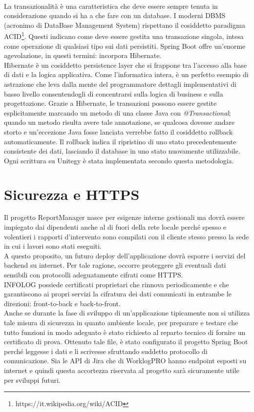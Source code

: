 \\
La transazionalità è una caratteristica che deve essere sempre tenuta in considerazione quando si ha a che fare con un database.
I moderni DBMS (acronimo di DataBase Management System) rispettano il cosiddetto paradigma ACID\footnote{https://it.wikipedia.org/wiki/ACID}.
Questi indicano come deve essere gestita una transazione singola, intesa come operazione di qualsiasi tipo sui dati persistiti.
Spring Boot offre un'enorme agevolazione, in questi termini: incorpora Hibernate.
\\
Hibernate è un cosiddetto persistence layer che si frappone tra l'accesso alla base di dati e la logica applicativa.
Come l'informatica intera, è un perfetto esempio di astrazione che leva dalla mente del programmatore dettagli implementativi di basso livello consentendogli di concentrarsi sulla
logica di business e sulla progettazione.
Grazie a Hibernate, le transazioni possono essere gestite esplicitamente marcando un metodo di una classe Java con \emph{@Transactional};
quando un metodo risulta avere tale annotazione, se qualcosa dovesse andare storto e un'eccezione Java fosse lanciata verrebbe fatto il cosiddetto rollback automaticamente.
Il rollback indica il ripristino di uno stato precedentemente consistente dei dati, lasciando il database in uno stato nuovamente utilizzabile.
Ogni scrittura su Unitegy è stata implementata secondo questa metodologia.

\section{Sicurezza e HTTPS}

Il progetto ReportManager nasce per esigenze interne gestionali ma dovrà essere impiegato dai dipendenti anche al di fuori della rete locale perché spesso e volentieri i rapporti
d'intervento sono compilati con il cliente stesso presso la sede in cui i lavori sono stati eseguiti.
\\
A questo proposito, un futuro deploy dell'applicazione dovrà esporre i servizi del backend su internet.
Per tale ragione, occorre proteggere gli eventuali dati sensibili con protocolli adeguatamente cifrati come HTTPS.
\\
INFOLOG possiede certificati proprietari che rinnova periodicamente e che garantiscono ai propri servizi la cifratura dei dati comunicati in entrambe le direzioni: front-to-back e
back-to-front.
\\
Anche se durante la fase di sviluppo di un'applicazione tipicamente non si utilizza tale misura di sicurezza in quanto ambiente locale, per preparare e testare che tutto funzioni
in modo adeguato è stato richiesto al reparto tecnico di fornire un certificato di prova.
Ottenuto tale file, è stato configurato il progetto Spring Boot perché leggesse i dati e li scrivesse sfruttando suddetto protocollo di comunicazione.
Sia le API di Jira che di WorklogPRO hanno endpoint esposti su internet e quindi questa accortezza riservata al progetto sarà sicuramente utile per sviluppi futuri.